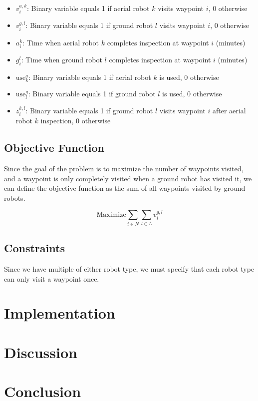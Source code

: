 \documentclass{article}
\begin{document}
				\begin{itemize}
				\item $v_i^{a,k}$: Binary variable equals 1 if aerial robot $k$ visits waypoint $i$, 0 otherwise
				\item $v_i^{g,l}$: Binary variable equals 1 if ground robot $l$ visits waypoint $i$, 0 otherwise
				\item $a_i^k$: Time when aerial robot $k$ completes inspection at waypoint $i$ (minutes)
				\item $g_i^l$: Time when ground robot $l$ completes inspection at waypoint $i$ (minutes)
				\item $\text{use}_k^a$: Binary variable equals 1 if aerial robot $k$ is used, 0 otherwise
				\item $\text{use}_l^g$: Binary variable equals 1 if ground robot $l$ is used, 0 otherwise
				\item $z_i^{k,l}$: Binary variable equals 1 if ground robot $l$ visits waypoint $i$ after aerial robot $k$ inspection, 0 otherwise
				\end{itemize}


		\subsection{Objective Function}

			Since the goal of the problem is to maximize the number of waypoints visited, and a waypoint is only completely visited when a ground robot has visited it, we can define the objective function as the sum of all waypoints visited by ground robots.

			\begin{equation}
			\text{Maximize} \sum_{i \in N}\sum_{l \in L} v_i^{g,l}
			\end{equation}
		
		\subsection{Constraints}
			
			Since we have multiple of either robot type, we must specify that each robot type can only visit a waypoint once.










	\section{Implementation}

	\section{Discussion}

	\section{Conclusion}

	\newpage
	
	\nocite{*}
	
\end{document}
